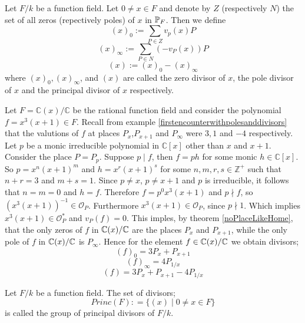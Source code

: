 \begin{definition} \label{princeDiv}
	Let $F/k $ be a function field. 
	Let $ 0 \neq x \in F$ and denote by $Z$ (respectively $N$) 
	the set of all zeros (repectively poles) of $x$ in $\mathbb{P}_F$. 
	Then we define
	$$ (x)_0 := \sum _{P \in Z} v_p(x) P$$ $$ (x)_{\infty} :=  
	\sum_{P\in N} (-v_P(x))P $$ $$ (x) := (x)_0  - (x)_{\infty} $$ 
	where $(x)_0,(x)_{\infty} $, and $(x)$ are called the 
	zero divisor of $x$, the pole divisor of $x$ and the 
	principal divisor of $x$ respectively. 
\end{definition}

\begin{example}
	Let $F = \mathbb{C}(x)/\mathbb{C}$ be the rational function field
	and consider the polynomial $f = x^3(x+1) \in F$. Recall from example
	\ref{firstencounterwithpolesanddivisors} that the
	valutions of $f$ at places $P_x$,$P_{x+1}$ and $P_\infty$ were $3,1$ 
	and $-4$ respectively. Let $p$ be a monic irreducible polynomial in
	$\mathbb{C}[x]$ other than $x$ and $x + 1$. Consider the place $P= P_p$. 
	Suppose $p \mid f $, then $f = ph$ for some monic $h \in \mathbb{C}[x]$. 
	So $p = x^n(x+1)^m$ and $h=x^r(x+1)^s$ for some $n,m,r,s \in \mathbb{Z}^+$ 
	such that $n+r = 3$ and $m+s = 1$. Since $p \neq x$, $p \neq x+1$ and $p$ is 
	irreducible, it follows that $n = m = 0$ and $h =f$. Therefore
	$f = p^0x^3(x+1)$ and $p \nmid f$, so $(x^3(x+1))^{-1} \in \mathcal{O}_P$. 
	Furthermore $x^3(x+1) \in \mathcal{O}_P$, since $p \nmid 1$. 
	Which implies $ x^3(x+1) \in \mathcal{O}_P^*$ and $v_P(f) = 0$. This imples, by theorem
	\ref{noPlaceLikeHome}, that the only zeros of $f$ in $\mathbb{C}(x)/ \mathbb{C}$
	are the places $P_{x}$ 
	and $P_{x+1}$, while the only pole of $f$ in $\mathbb{C}(x)/ \mathbb{C}$
	is $P_\infty$. Hence for 
	the element $f \in \mathbb{C}(x) / \mathbb{C}$ we obtain divisors; 
	$$(f)_0 = 3P_x + P_{x+1}$$
	$$(f)_{\infty} = 4P_{1/x}$$ 
	$$(f) = 3P_x + P_{x+1} - 4P_{1/x}$$
\end{example}

\begin{definition} \label{divPrinc}
	Let $F/k $ be a function field. 
	The set of divisors; $$ Princ(F) : = \lbrace (x) \mid 0 \neq x \in F \rbrace  $$ 
	is called the group of principal divisors of $F/k$.
\end{definition}

